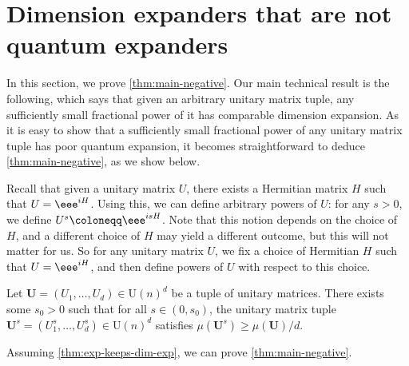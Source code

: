 \documentclass{toc}
\theoremstyle{plain}
\numberwithin{equation}{section}
\theoremstyle{definition}
\newcommand{\tuple}[1]{\mathbf{#1}}
\newcommand{\vU}{\tuple{U}}
\begin{document}
%

\section{Dimension expanders that are not quantum expanders}\label{sec:dim-not-quantum}
In this section, we prove \cref{thm:main-negative}. Our main technical result is the following, which says that given an arbitrary unitary matrix tuple, any sufficiently small fractional power of it has comparable dimension expansion. As it is easy to show that a sufficiently small fractional power of any unitary matrix tuple has poor quantum expansion, it becomes straightforward to deduce \cref{thm:main-negative}, as we show below.

Recall that given a unitary matrix $U$, there exists a Hermitian matrix $H$ such that 
$U = \eee^{iH}$. Using this, we can define arbitrary powers of $U$: for any $s>0$, we define $U^s \coloneqq \eee^{isH}$. Note that this notion depends on the choice of $H$, and a different choice of $H$ may yield a different outcome, but this will not matter for us. So for any unitary matrix $U$, we fix a choice of Hermitian $H$ such that $U=\eee^{iH}$, and then define powers of $U$ with respect to this choice.
\begin{theorem}\label{thm:exp-keeps-dim-exp}
    Let $\vU=(U_1,\dots,U_d)\in \mathrm{U}(n)^d$ be a tuple of unitary matrices. There exists some $s_0>0$ such that for all $s \in (0,s_0)$, the unitary matrix tuple $\vU^s=(U_1^s,\dots,U_d^s)\in\mathrm{U}(n)^d$ satisfies $\mu(\vU^s) \geq \mu(\vU)/d$.
\end{theorem}

Assuming \cref{thm:exp-keeps-dim-exp}, we can prove \cref{thm:main-negative}.
\end{document}
